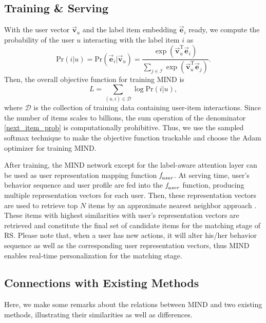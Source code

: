 \documentclass[sigconf]{acmart}
\begin{document}
\subsection{Training \& Serving}
With the user vector $\overrightarrow{\boldsymbol{v}}_u$ and the label item embedding $\overrightarrow{\boldsymbol{e}}_i$ ready, we compute the probability of the user $u$ interacting with the label item $i$ as
\begin{equation}
  \label{next_item_prob}
  \text{Pr} (i|u) = \text{Pr} \left(\overrightarrow{\boldsymbol{e}}_i | \overrightarrow{\boldsymbol{v}}_u \right)
  = \frac{\exp\left(
  \overrightarrow{\boldsymbol{v}}_u^{\textrm{T}} \overrightarrow{\boldsymbol{e}}_i
  \right)
  }
  {
  \sum_{j\in \mathcal{I}} \exp\left(
  \overrightarrow{\boldsymbol{v}}_u^{\textrm{T}} \overrightarrow{\boldsymbol{e}}_j
  \right)
  }.
\end{equation}
Then, the overall objective function for training MIND is
\begin{equation}
  L = \sum_{(u,i) \in \mathcal{D}} \log \text{Pr} (i | u),
\end{equation}
where $\mathcal{D}$ is the collection of training data containing user-item interactions.
Since the number of items scales to billions, the sum operation of the denominator \eqref{next_item_prob} is computationally prohibitive.
Thus, we use the sampled softmax technique \cite{covington2016deep} to make the objective function trackable and choose the Adam optimizer \cite{kingma2014adam} for training MIND.

After training, the MIND network except for the label-aware attention layer can be used as user representation mapping function $\emph{f}_{user}$.
At serving time, user's behavior sequence and user profile are fed into the $\emph{f}_{user}$ function, producing multiple representation vectors for each user.
Then, these representation vectors are used to retrieve top $N$ items by an approximate nearest neighbor approach \cite{johnson2017billion}.
These items with highest similarities with user's representation vectors are retrieved and constitute the final set of candidate items for the matching stage of RS.
Please note that, when a user has new actions, it will alter his/her behavior sequence as well as the corresponding user representation vectors, thus MIND enables real-time personalization for the matching stage.

\subsection{Connections with Existing Methods}
Here, we make some remarks about the relations between MIND and two existing methods, illustrating their similarities as well as differences.
\end{document}
